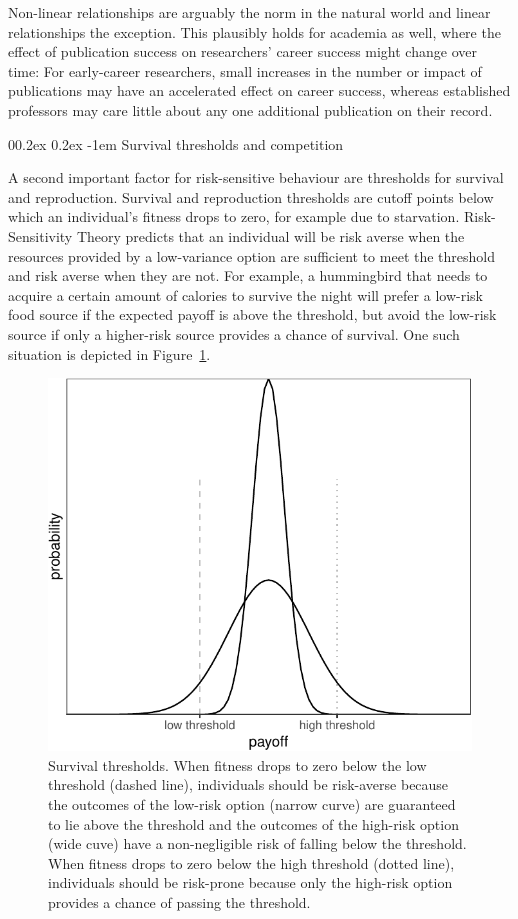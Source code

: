 \documentclass[british,,man,floatsintext]{apa6}
\makeatletter
\renewcommand{\paragraph}{\@startsection{paragraph}{4}{\parindent}%
  {0\baselineskip \@plus 0.2ex \@minus 0.2ex}%
  {-1em}%
  {\normalfont\normalsize\bfseries\itshape\typesectitle}}
\makeatother
\begin{document}
Non-linear relationships are arguably the norm in the natural world and linear relationships the exception.
This plausibly holds for academia as well, where the effect of publication success on researchers' career success might change over time:
For early-career researchers, small increases in the number or impact of publications may have an accelerated effect on career success, whereas established professors may care little about any one additional publication on their record.

\hypertarget{survival-thresholds-and-competition}{%
\paragraph{Survival thresholds and competition}\label{survival-thresholds-and-competition}}

A second important factor for risk-sensitive behaviour are thresholds for survival and reproduction.
Survival and reproduction thresholds are cutoff points below which an individual's fitness drops to zero, for example due to starvation.
Risk-Sensitivity Theory predicts that an individual will be risk averse when the resources provided by a low-variance option are sufficient to meet the threshold and risk averse when they are not.
For example, a hummingbird that needs to acquire a certain amount of calories to survive the night will prefer a low-risk food source if the expected payoff is above the threshold, but avoid the low-risk source if only a higher-risk source provides a chance of survival.
One such situation is depicted in Figure~\ref{fig:varianceplot}.



\begin{figure}
\includegraphics[width=0.6\linewidth]{rr-risk-sensitivity_files/figure-latex/varianceplot-1} \caption{Survival thresholds. When fitness drops to zero below the low threshold (dashed line), individuals should be risk-averse because the outcomes of the low-risk option (narrow curve) are guaranteed to lie above the threshold and the outcomes of the high-risk option (wide cuve) have a non-negligible risk of falling below the threshold. When fitness drops to zero below the high threshold (dotted line), individuals should be risk-prone because only the high-risk option provides a chance of passing the threshold.}\label{fig:varianceplot}
\end{figure}
\end{document}
